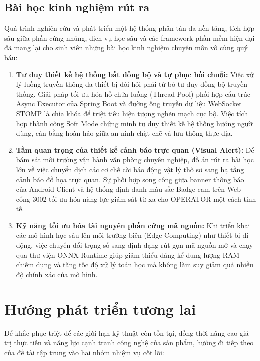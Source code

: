 ﻿\documentclass[../DoAn.tex]{subfiles}
\begin{document}
\subsection{Bài học kinh nghiệm rút ra}
Quá trình nghiên cứu và phát triển một hệ thống phân tán đa nền tảng, tích hợp sâu giữa phần cứng nhúng, dịch vụ học sâu và các framework phần mềm hiện đại đã mang lại cho sinh viên những bài học kinh nghiệm chuyên môn vô cùng quý báu:
\begin{enumerate}
    \item \textbf{Tư duy thiết kế hệ thống bất đồng bộ và tự phục hồi chuỗi:} Việc xử lý luồng truyền thông đa thiết bị đòi hỏi phải từ bỏ tư duy đồng bộ truyền thống. Giải pháp tối ưu hóa hồ chứa luồng (Thread Pool) phối hợp cấu trúc Async Executor của Spring Boot và đường ống truyền dữ liệu WebSocket STOMP là chìa khóa để triệt tiêu hiện tượng nghẽn mạch cục bộ. Việc tích hợp thành công Soft Mode chứng minh tư duy thiết kế hệ thống hướng người dùng, cân bằng hoàn hảo giữa an ninh chặt chẽ và lưu thông thực địa.
    \item \textbf{Tầm quan trọng của thiết kế cảnh báo trực quan (Visual Alert):} Để bám sát môi trường vận hành văn phòng chuyên nghiệp, đồ án rút ra bài học lớn về việc chuyển dịch các cơ chế còi báo động vật lý thô sơ sang hạ tầng cảnh báo đồ họa trực quan. Sự phối hợp song công giữa banner thông báo của Android Client và hệ thống định danh màu sắc Badge cam trên Web cổng 3002 tối ưu hóa năng lực giám sát từ xa cho OPERATOR một cách tinh tế.
    \item \textbf{Kỹ năng tối ưu hóa tài nguyên phần cứng mã nguồn:} Khi triển khai các mô hình học sâu lên môi trường biên (Edge Computing) như thiết bị di động, việc chuyển đổi trọng số sang định dạng rút gọn mã nguồn mở và chạy qua thư viện ONNX Runtime giúp giảm thiểu đáng kể dung lượng RAM chiếm dụng và tăng tốc độ xử lý toán học mà không làm suy giảm quá nhiều độ chính xác của mô hình.
\end{enumerate}

\section{Hướng phát triển tương lai}
\label{section:6.2}

Để khắc phục triệt để các giới hạn kỹ thuật còn tồn tại, đồng thời nâng cao giá trị thực tiễn và năng lực cạnh tranh công nghệ của sản phẩm, hướng đi tiếp theo của đề tài tập trung vào hai nhóm nhiệm vụ cốt lõi:
\end{document}
